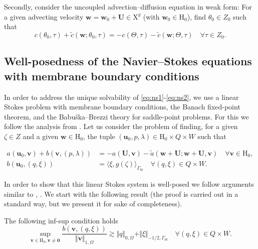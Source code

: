 \documentclass[onefignum,onetabnum,reqno,a4paper,final]{siamart250211}
\newcommand\bu{\boldsymbol{u}}
\newcommand\bv{\boldsymbol{v}}
\newcommand\bw{\boldsymbol{w}}
\newcommand\0{\mathbf{0}}
\newcommand\bU{\boldsymbol{U}}
\newcommand\bH{\boldsymbol{\mathrm{H}}}
\newcommand\bX{\boldsymbol{\mathrm{X}}}
\newcommand\Gm{\Gamma_{\mathrm{m}}}
\numberwithin{figure}{section}
\numberwithin{table}{section}
\begin{document}
Secondly, consider the uncoupled advection--diffusion equation in weak form: For a given advecting velocity $\bw =\bw_0 + \bU \in \bX^g$ (with $\bw_0 \in \bH_0$), find $\theta_0\in Z_0$ such that  
\begin{equation}
	\label{eq:diff}    c(\theta_0,\tau) + \widetilde{c}(\bw;\theta_0,\tau) = -c(\Theta,\tau) - \widetilde{c}(\bw; \Theta,\tau) \quad \forall \tau \in Z_0.
\end{equation}


\subsection{Well-posedness of the Navier--Stokes equations with membrane boundary conditions}\label{sec:wellp-ns}
In order to address the unique solvability of \eqref{eq:ns1}-\eqref{eq:ns2}, we use a linear Stokes problem with membrane boundary conditions, the Banach fixed-point theorem, and the  Babu\v{s}ka--Brezzi theory for saddle-point problems. %
For this we follow the analysis from \cite{cocquet2021error}. 
%
Let us consider the problem of finding, for a given $\zeta\in Z$ and a given $\bw\in\bH_0$, the tuple  $(\bu_0,p,\lambda) \in \bH_0\times Q\times W$ such that 
\begin{linenomath}
	\begin{subequations}
		\begin{align}
			\label{eq:stokes1}   a(\bu_0,\bv)  + b(\bv,(p,\lambda)) & = - a(\bU,\bv) - \widetilde{a}(\bw+\bU;\bw+\bU,\bv) \quad \forall \bv \in \bH_0,\\
			\label{eq:stokes2}    b(\bu_0,(q,\xi)) & = \langle \xi, g(\zeta) \rangle_{\Gm} \quad \forall (q,\xi)\in Q\times W.
		\end{align}
\end{subequations}\end{linenomath}
In order to show that this linear Stokes system is well-posed we follow  arguments similar to \cite[Lemma 3.1]{verfurth86}, \cite{ern2004applied,layton1999weak}.  We start with  the following result (the proof is carried out in a standard way, but we present it for sake of completeness). 
\begin{lemma}\label{lem:B-inf}
	The following inf-sup condition holds 
	\[
	\sup_{\bv\in \bH_0,\bv\neq\boldsymbol{0}}\frac{
		 b(\bv,(q,\xi)) 
	}{\Vert\bv\Vert_{1,\Omega}}\gtrsim \Vert q\Vert_{0,\Omega}+\Vert \xi\Vert_{-1/2,\Gm} \quad \forall (q,\xi)\in Q\times W. %
	\]
\end{lemma}
\end{document}
